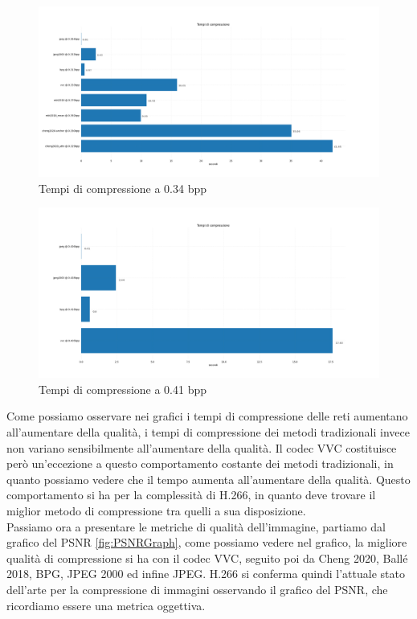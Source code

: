 \newpage
\begin{figure}[!h]
    \centering
    \includegraphics[width=1\textwidth]{Immagini/METRICS/times@0.34bpp.png}
    \caption{Tempi di compressione a 0.34 bpp}
    \label{fig:times34}
\end{figure}
\hspace{0.5cm}
\begin{figure}[!h]
    \centering
    \includegraphics[width=1\textwidth]{Immagini/METRICS/times@0.41bpp.png}
    \caption{Tempi di compressione a 0.41 bpp}
    \label{fig:times41}
\end{figure}
\newpage
\clearpage 
Come possiamo osservare nei grafici i tempi di compressione delle reti aumentano all’aumentare della qualità, i tempi di compressione dei metodi tradizionali invece non variano sensibilmente all’aumentare della qualità. Il codec VVC costituisce però un’eccezione a questo comportamento costante dei metodi tradizionali, in quanto possiamo vedere che il tempo aumenta all’aumentare della qualità. Questo comportamento si ha per la complessità di H.266, in quanto deve trovare il miglior metodo di compressione tra quelli a sua disposizione.\\
Passiamo ora a presentare le metriche di qualità dell’immagine, partiamo dal grafico del PSNR \ref{fig:PSNRGraph}, come possiamo vedere nel grafico, la migliore qualità di compressione si ha con il codec VVC, seguito poi da Cheng 2020, Ballé 2018, BPG, JPEG 2000 ed infine JPEG. H.266 si conferma quindi l’attuale stato dell’arte per la compressione di immagini osservando il grafico del PSNR, che ricordiamo essere una metrica oggettiva.\\
